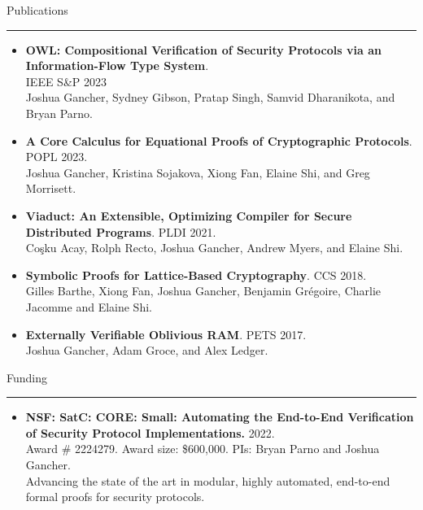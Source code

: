 \documentclass{article}
\begin{document}
\vspace{10pt}
{\huge Publications}
\vspace{3pt}
 \hrule
\begin{itemize}
    \item {\bf OWL: Compositional Verification of Security Protocols
        via an Information-Flow Type System}. \\ IEEE S\&P 2023 \\
    Joshua Gancher, Sydney Gibson, Pratap Singh, Samvid Dharanikota, and Bryan
        Parno.
    \item {\bf A Core Calculus for Equational Proofs of Cryptographic
        Protocols}. POPL 2023. \\ Joshua Gancher, Kristina Sojakova, Xiong Fan,
        Elaine Shi, and Greg Morrisett.  
    \item {\bf Viaduct: An Extensible, Optimizing Compiler for Secure
        Distributed Programs}. PLDI 2021.
        \\
        Coşku Acay, Rolph Recto, Joshua Gancher, Andrew Myers, and Elaine Shi.
    \item \textbf{Symbolic Proofs for Lattice-Based Cryptography}. CCS 2018. 
        \\
    {Gilles Barthe, Xiong Fan, Joshua Gancher, Benjamin Grégoire, Charlie Jacomme and Elaine Shi.}
    \item \textbf{Externally Verifiable Oblivious RAM}. PETS 2017.
        \\
    Joshua Gancher, Adam Groce, and Alex Ledger.
\end{itemize}

\vspace{10pt}
{\huge Funding}
\vspace{3pt}
 \hrule
 \begin{itemize}
     \item {\bf NSF: SatC: CORE: Small: Automating the End-to-End Verification
         of Security Protocol Implementations.} 2022.
         \\
         Award \# 2224279. Award size: \$600,000. PIs: Bryan Parno and Joshua
         Gancher.
         \\
         Advancing the state of the art in modular, highly automated, end-to-end formal
         proofs for security protocols. 
 \end{itemize}



\end{document}
